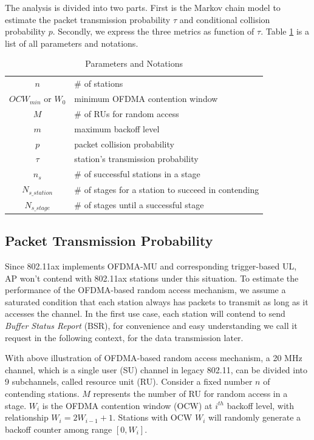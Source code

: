 \documentclass[journal]{IEEEtran}
\begin{document}
The analysis is divided into two parts. First is the Markov chain model to estimate the packet transmission probability $\tau$ and conditional collision probability $p$. 
Secondly, we express the three metrics as function of $\tau$. 
Table \ref{table_notation} is a list of all parameters and notations.

\begin{table}[!h]
\caption{Parameters and Notations}
\centering
\label{table_notation}
\begin{tabular}{c|l}
\hline
$n$						& $\#$ of stations \\
$OCW_{min}$ or $W_0$		& minimum OFDMA contention window \\
$M$						& $\#$ of RUs for random access \\
$m$						& maximum backoff level \\
$p$						& packet collision probability \\
$\tau$					& station's transmission probability \\
$n_s$					& $\#$ of successful stations in a stage \\
$N_{s\_station}$			& $\#$ of stages for a station to succeed in contending \\
$N_{s\_stage}$			& $\#$ of stages until a successful stage \\
\hline
\end{tabular}
\end{table}

\subsection{Packet Transmission Probability}
Since 802.11ax implements OFDMA-MU and corresponding trigger-based UL, AP won't contend with 802.11ax stations under this situation.
To estimate the performance of the OFDMA-based random access mechanism, we assume a saturated condition that each station always has packets to transmit as long as it accesses the channel.
In the first use case, each station will contend to send \textit{Buffer Status Report} (BSR), for convenience and easy understanding we call it request in the following context, for the data transmission later. 

With above illustration of OFDMA-based random access mechanism, a 20 MHz channel, which is a single user (SU) channel in legacy 802.11, can be divided into 9 subchannels, called resource unit (RU). Consider a fixed number $n$ of contending stations. 
$M$ represents the number of RU for random access in a stage. 
$W_i$ is the OFDMA contention window (OCW) at $i^{th}$ backoff level, with relationship $W_i = 2W_{i-1}+1$. Stations with OCW $W_i$ will randomly generate a backoff counter among range $[0,W_i]$.  
\end{document}
